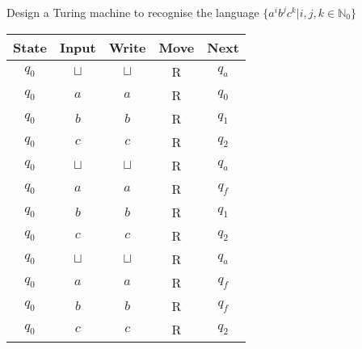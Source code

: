 \documentclass[addpoints,12pt]{exam}
\begin{document}
\begin{questions}
\question
  Design a Turing machine to recognise the language $\{ a^ib^jc^k | i,j,k \in \mathbb{N}_0 \}$
  \begin{solution}
    \begin{table}[H]
      \centering
      \begin{tabular}{ccccc}
        \toprule
            State & Input & Write & Move & Next \\
        \midrule
            $q_0$ & $\sqcup$ & $\sqcup$ & R & $q_a$ \\
            $q_0$ & $a$      & $a$      & R & $q_0$ \\
            $q_0$ & $b$      & $b$      & R & $q_1$ \\
            $q_0$ & $c$      & $c$      & R & $q_2$ \\
        \midrule
            $q_0$ & $\sqcup$ & $\sqcup$ & R & $q_a$ \\
            $q_0$ & $a$      & $a$      & R & $q_f$ \\
            $q_0$ & $b$      & $b$      & R & $q_1$ \\
            $q_0$ & $c$      & $c$      & R & $q_2$ \\
        \midrule
            $q_0$ & $\sqcup$ & $\sqcup$ & R & $q_a$ \\
            $q_0$ & $a$      & $a$      & R & $q_f$ \\
            $q_0$ & $b$      & $b$      & R & $q_f$ \\
            $q_0$ & $c$      & $c$      & R & $q_2$ \\
        \bottomrule
        \hline
      \end{tabular}
    \end{table}
  \end{solution}

\end{questions}


\end{document}
